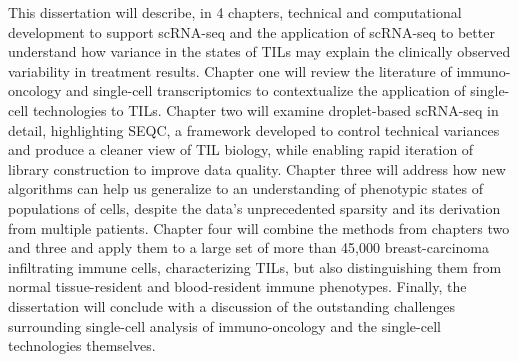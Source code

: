 This dissertation will describe, in 4 chapters, technical and computational development to support scRNA-seq and the application of scRNA-seq to better understand how variance in the states of TILs may explain the clinically observed variability in treatment results.
Chapter one will review the literature of immuno-oncology and single-cell transcriptomics to contextualize the application of single-cell technologies to TILs.
Chapter two will examine droplet-based scRNA-seq in detail, highlighting SEQC, a framework developed to control technical variances and produce a cleaner view of TIL biology, while enabling rapid iteration of library construction to improve data quality. 
Chapter three will address how new algorithms can help us generalize to an understanding of phenotypic states of populations of cells, despite the data's unprecedented sparsity and its derivation from multiple patients.  
Chapter four will combine the methods from chapters two and three and apply them to a large set of more than 45,000 breast-carcinoma infiltrating immune cells, characterizing TILs, but also distinguishing them from normal tissue-resident and blood-resident immune phenotypes.
Finally, the dissertation will conclude with a discussion of the outstanding challenges surrounding single-cell analysis of immuno-oncology and the single-cell technologies themselves.

